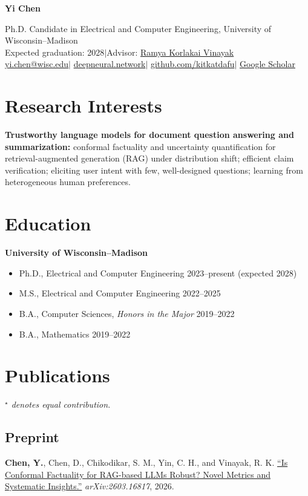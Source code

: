 \documentclass[11pt,letterpaper]{article}
\newcommand{\me}{\textbf{Chen, Y.}}
\begin{document}
\thispagestyle{firstpage}
{\Huge\bfseries Yi Chen}\par
\vspace{5pt}
Ph.D. Candidate in Electrical and Computer Engineering, University of Wisconsin--Madison\\
Expected graduation: 2028\enspace$\vert$\enspace Advisor: \href{https://ramyakv.github.io/}{Ramya Korlakai Vinayak}\\
\href{mailto:yi.chen@wisc.edu}{yi.chen@wisc.edu}\enspace$\vert$\enspace
\href{https://www.deepneural.network/}{deepneural.network}\enspace$\vert$\enspace
\href{https://github.com/kitkatdafu}{github.com/kitkatdafu}\enspace$\vert$\enspace
\href{https://scholar.google.com/citations?user=QoO6pMEAAAAJ}{Google Scholar}

\section*{Research Interests}
\textbf{Trustworthy language models for document question answering and summarization:} conformal factuality and uncertainty quantification for retrieval-augmented generation (RAG) under distribution shift; efficient claim verification; eliciting user intent with few, well-designed questions; learning from heterogeneous human preferences.

\section*{Education}
\textbf{University of Wisconsin--Madison}
\begin{itemize}[label={},leftmargin=0pt,itemsep=2pt]
\item Ph.D., Electrical and Computer Engineering \hfill 2023--present (expected 2028)
\item M.S., Electrical and Computer Engineering \hfill 2022--2025
\item B.A., Computer Sciences, \textit{Honors in the Major} \hfill 2019--2022
\item B.A., Mathematics \hfill 2019--2022
\end{itemize}

\section*{Publications}
\textit{$^\star$ denotes equal contribution.}

\subsection*{Preprint}
\begin{pubs}
\item \me, Chen, D., Chikodikar, S. M., Yin, C. H., and Vinayak, R. K.
\href{https://arxiv.org/abs/2603.16817}{``Is Conformal Factuality for RAG-based LLMs Robust? Novel Metrics and Systematic Insights.''}
\textit{arXiv:2603.16817}, 2026.
\end{pubs}
\end{document}
